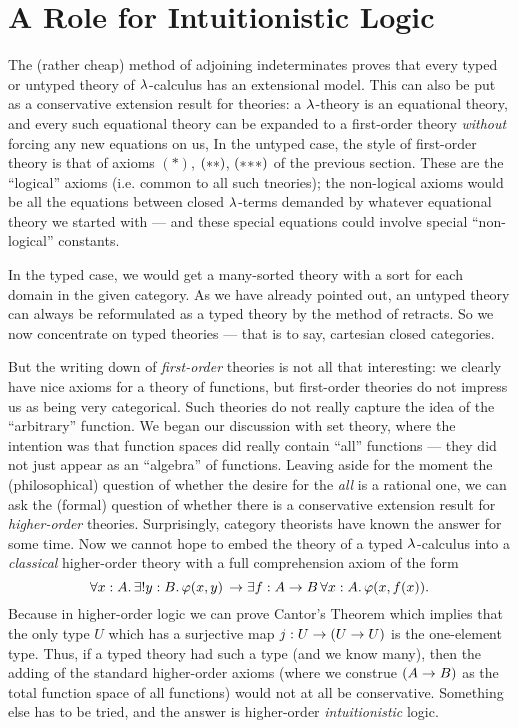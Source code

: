 \section{A Role for Intuitionistic Logic}

The (rather cheap) method of adjoining indeterminates proves that every typed or untyped theory of $\l$-calculus has an extensional model. This can also be put as a conservative extension result for theories: a $\l$-theory is an equational theory, and every such equational theory can be expanded to a first-order theory {\it without} forcing any new equations on us,  In the untyped case, the style of first-order theory is that of axioms $(*)$, $\ss$, $\sss$ of the previous section. These are the ``logical'' axioms (i.e. common to all such tneories); the non-logical axioms would be all the equations between closed $\l$-terms demanded by whatever equational theory we started with --- and these special equations could involve special ``non-logical'' constants.

In the typed case, we would get a many-sorted theory with a sort for each domain in the given category. As we have already pointed out, an untyped theory can always be reformulated as a typed theory by the method of retracts. So we now concentrate on typed theories --- that is to say, cartesian closed categories.

But the writing down of {\it first-order} theories is not all that interesting: we clearly have nice axioms for a theory of functions, but first-order theories do not impress us as being very categorical. Such theories do not really capture the idea of the ``arbitrary'' function. We began our discussion with set theory, where the intention was that function spaces did really contain ``all'' functions --- they did not just appear as an ``algebra'' of functions. Leaving aside for the moment the (philosophical) question of whether the desire for the {\it all} is a rational one, we can ask the (formal) question of whether there is a conservative extension result for {\it higher-order} theories. Surprisingly, category theorists have known the answer for some time.
Now we cannot hope to embed the theory of a typed $\l$-calculus into a {\it classical} higher-order theory with a full comprehension axiom of the form
$$
\forall x:A .\, \exists !y: B .\,  \ffam(x,y)  \, \to  \exists f: \AB \, \forall x: A .\, \ffam(x,f(x)).
$$
Because in higher-order logic we can prove Cantor's Theorem which implies that the only type $U$ which has a surjective map
$j : U \to \UU$ is the one-element type. Thus, if a typed theory had such a type (and we know many), then the adding of the
standard higher-order axioms (where we construe $(\AB)$ as the total function space of all functions) would not at all be conservative. Something else has to be tried, and the answer is higher-order {\it intuitionistic} logic.

